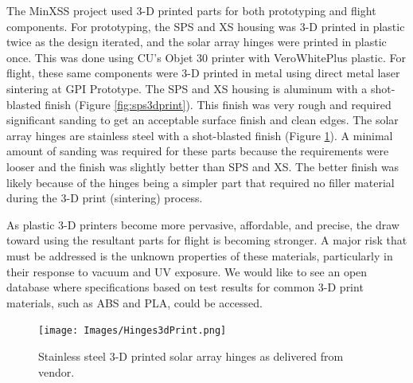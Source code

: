 The MinXSS project used 3-D printed parts for both prototyping and flight components. For prototyping, the SPS and XS housing was 3-D printed in plastic twice as the design iterated, and the solar array hinges were printed in plastic once. This was done using CU's Objet 30 printer with VeroWhitePlus plastic. For flight, these same components were 3-D printed in metal using direct metal laser sintering at GPI Prototype. The SPS and XS housing is aluminum with a shot-blasted finish (Figure \ref{fig:sps3dprint}). This finish was very rough and required significant sanding to get an acceptable surface finish and clean edges. The solar array hinges are stainless steel with a shot-blasted finish (Figure \ref{fig:hinges3dprint}). A minimal amount of sanding was required for these parts because the requirements were looser and the finish was slightly better than SPS and XS. The better finish was likely because of the hinges being a simpler part that required no filler material during the 3-D print (sintering) process.

As plastic 3-D printers become more pervasive, affordable, and precise, the draw toward using the resultant parts for flight is becoming stronger. A major risk that must be addressed is the unknown properties of these materials, particularly in their response to vacuum and UV exposure. We would like to see an open database where specifications based on test results for common 3-D print materials, such as ABS and PLA, could be accessed.

\begin{figure}[!h]
    \begin{center}
	    \texttt{[image: Images/Hinges3dPrint.png]}
    \end{center}
    \caption[Stainless steel 3-D printed solar panel hinges]{
        Stainless steel 3-D printed solar array hinges as delivered from vendor.  
    }
    \label{fig:hinges3dprint}
\end{figure}

